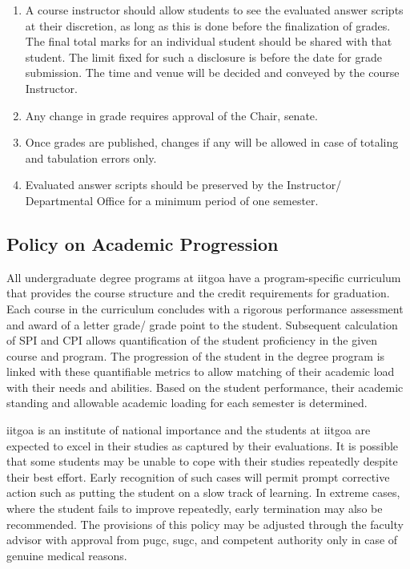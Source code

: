 \begin{enumerate}[leftmargin=15mm]
    \item A course instructor should allow \glspl{student} to see the evaluated answer scripts at their discretion, as long as this is done before the finalization of grades. The final total marks for an individual \gls{student} should be shared with that \gls{student}. The limit fixed for such a disclosure is before the date for grade submission. The time and venue will be decided and conveyed by the course Instructor.
    \item Any change in grade requires approval of the Chair, \Gls{senate}.
    \item Once grades are published, changes if any will be allowed in case of totaling and tabulation errors only. 
    \item Evaluated answer scripts should be preserved by the Instructor/ Departmental Office for a minimum period of one semester. 
\end{enumerate}

\subsection{Policy on Academic Progression \label{lab:Policy on Academic Progression}}

All undergraduate degree programs at \acrshort{iitgoa} have a program-specific curriculum that provides the course structure and the credit requirements for graduation. Each course in the curriculum concludes with a rigorous performance assessment and award of a letter grade/ grade point to the \gls{student}. Subsequent calculation of SPI and CPI allows quantification of the \gls{student} proficiency in the given course and program. The progression of the \gls{student} in the degree program is linked with these quantifiable metrics to allow matching of their academic load with their needs and abilities. Based on the \gls{student} performance, their academic standing and allowable academic loading for each semester is determined. 

\acrshort{iitgoa} is an institute of national importance and the \glspl{student} at \acrshort{iitgoa} are expected to excel in their studies as captured by their evaluations. It is possible that some \glspl{student} may be unable to cope with their studies repeatedly despite their best effort. Early recognition of such cases will permit prompt corrective action such as putting the \gls{student} on a slow track of learning. In extreme cases, where the \gls{student} fails to improve repeatedly, early termination may also be recommended. The provisions of this policy may be adjusted through the faculty advisor with approval from \acrshort{pugc}, \acrshort{sugc}, and competent authority only in case of genuine medical reasons.

